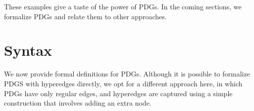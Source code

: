 \documentclass[letterpaper]{article} %
\theoremstyle{plain}
\theoremstyle{definition}
\theoremstyle{remark}
\newcommand\vfull[1]{{\color{vfullcolor} #1}}
\renewcommand\vfull[1]{} %
\begin{document}
These examples give a taste of the power of PDGs.  In the coming sections, we formalize PDGs and relate them to other approaches.		
	
	
\section{Syntax}\label{sec:formal+syntax}
We now provide formal definitions for PDGs.        
Although it is possible to formalize PDGS with hyperedges directly,
    we opt for a different approach here, in which PDGs have only regular edges,
and hyperedges are captured using a simple construction
that involves adding an extra node.

\vfull{\footnote{In the factor graph literature,
          especially with regard to loopy belief propagation
          \cite{wainwright2007graphical}, it is common to
          call a collection of marginals that are not
          necessarily all compatible with a distribution
          \emph{pseudomarginals}, making a PDG in some sense a
          collection of `conditional' pseudomarginals. This
          gives an alternate, more technically precise
          expansion of PDG as ``Pseudomarginal Dependency Graph''.}}
\end{document}
